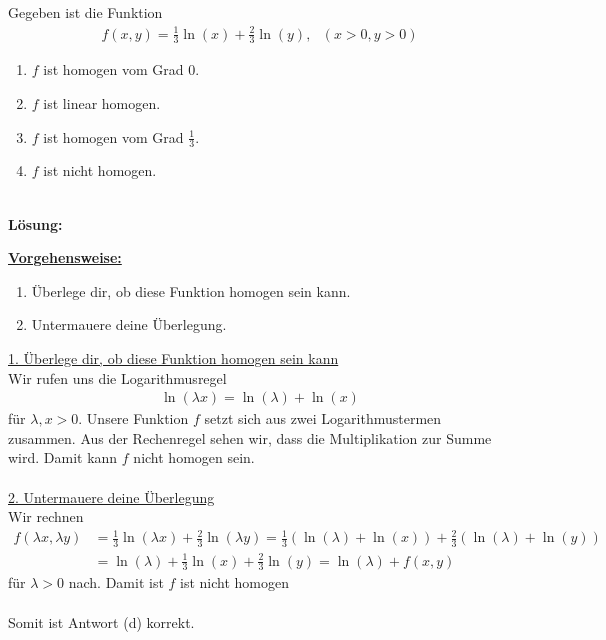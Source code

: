 \newpage

\subsection*{}
Gegeben ist die Funktion 
\begin{align*}
f(x,y) = \frac{1}{3} \ln(x) + \frac{2}{3} \ln(y), \ \ \
(x>0 , y>0 )
\end{align*}
\renewcommand{\labelenumi}{(\alph{enumi})}
\begin{enumerate}
\item $f$ ist homogen vom Grad $0$.
\item $f$ ist linear homogen.
\item $f$ ist homogen vom Grad $\frac{1}{3}$.
\item $f$ ist nicht homogen.
\end{enumerate}
\ \\
\textbf{Lösung:}
\begin{mdframed}
\underline{\textbf{Vorgehensweise:}}
\renewcommand{\labelenumi}{\theenumi.}
\begin{enumerate}
\item Überlege dir, ob diese Funktion homogen sein kann.
\item Untermauere deine Überlegung.
\end{enumerate}
\end{mdframed}

\underline{1. Überlege dir, ob diese Funktion homogen sein kann}\\
Wir rufen uns die Logarithmusregel
\begin{align*}
\ln( \lambda  x ) =\ln(\lambda) + \ln(x)
\end{align*}
für $\lambda, x > 0$.
Unsere Funktion $f$ setzt sich aus zwei Logarithmustermen zusammen.
Aus der Rechenregel sehen wir, dass die Multiplikation zur Summe wird. Damit kann $f$ nicht homogen sein.\\
\\
\underline{2. Untermauere deine Überlegung}\\
Wir rechnen
\begin{align*}
f(\lambda x, \lambda y) 
&= 
\frac{1}{3} \ln(\lambda x) + \frac{2}{3} \ln(\lambda y)
=
\frac{1}{3}( \ln(\lambda) + \ln(x)) + \frac{2}{3} ( \ln(\lambda) + \ln(y))\\
&=
\ln(\lambda) + \frac{1}{3} \ln(x) + \frac{2}{3} \ln(y)
= 
\ln(\lambda) + f(x,y)
\end{align*}
für $\lambda >0 $ nach.
Damit ist $f$ ist nicht homogen\\
\\
Somit ist Antwort (d) korrekt.

